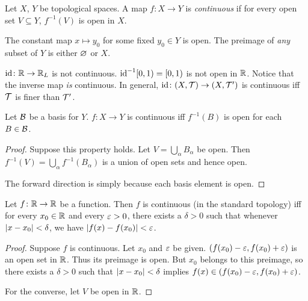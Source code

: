 \begin{definition*}
    Let $X$, $Y$ be topological spaces.
    A map $f\colon X \to Y$ is \emph{continuous} if for every open set
    $V \subseteq Y$, $f^{-1}(V)$ is open in $X$.
\end{definition*}
\begin{examples}
    \item The constant map $x \mapsto y_0$ for some fixed $y_0 \in Y$
    is open.
    The preimage of \emph{any} subset of $Y$ is either $\varnothing$ or $X$.
    \item $\operatorname{id}\colon \mathbb{R} \to \mathbb{R}_L$ is not continuous.
    $\operatorname{id}^{-1}[0, 1) = [0, 1)$ is not open in $\mathbb{R}$.
    Notice that the inverse map \emph{is} continuous.
    In general, $\operatorname{id}\colon (X, \mathcal{T}) \to (X, \mathcal{T}')$ is continuous iff
    $\mathcal{T}$ is finer than $\mathcal{T}'$.
\end{examples}

\begin{corollary}
    Let $\mathcal{B}$ be a basis for $Y$.
    $f\colon X \to Y$ is continuous iff $f^{-1}(B)$ is open for each
    $B \in \mathcal{B}$.
\end{corollary}
\begin{proof}
    Suppose this property holds.
    Let $V = \bigcup_\alpha B_\alpha$ be open.
    Then $f^{-1}(V) = \bigcup_\alpha f^{-1}(B_\alpha)$ is a union of
    open sets and hence open.

    The forward direction is simply because each basis element is open.
\end{proof}

\begin{proposition*}
    Let $f\colon \mathbb{R} \to \mathbb{R}$ be a function.
    Then $f$ is continuous (in the standard topology) iff for every
    $x_0 \in \mathbb{R}$ and every $\varepsilon > 0$, there exists a $\delta > 0$ such that
    whenever $\lvert x - x_0\rvert < \delta$, we have $\lvert f(x) - f(x_0)\rvert < \varepsilon$.
\end{proposition*}
\begin{proof}
    Suppose $f$ is continuous.
    Let $x_0$ and $\varepsilon$ be given.
    $(f(x_0) - \varepsilon, f(x_0) + \varepsilon)$ is an open set in $\mathbb{R}$.
    Thus its preimage is open.
    But $x_0$ belongs to this preimage, so there exists a $\delta > 0$
    such that $\lvert x - x_0\rvert < \delta$ implies
    $f(x) \in (f(x_0) - \varepsilon, f(x_0) + \varepsilon)$.

    For the converse, let $V$ be open in $\mathbb{R}$.
\end{proof}

